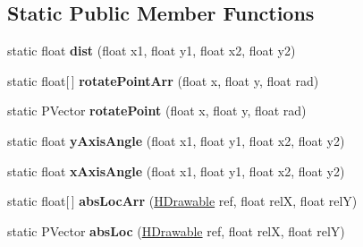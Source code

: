 \subsection*{Static Public Member Functions}
\begin{DoxyCompactItemize}
\item 
\hypertarget{classhype_1_1util_1_1_h_math_ad217e1364265a2807ccfea46656c98c3}{static float {\bfseries dist} (float x1, float y1, float x2, float y2)}\label{classhype_1_1util_1_1_h_math_ad217e1364265a2807ccfea46656c98c3}

\item 
\hypertarget{classhype_1_1util_1_1_h_math_ae8023e98d4523ae08d796cf9f62191f2}{static float\mbox{[}$\,$\mbox{]} {\bfseries rotate\-Point\-Arr} (float x, float y, float rad)}\label{classhype_1_1util_1_1_h_math_ae8023e98d4523ae08d796cf9f62191f2}

\item 
\hypertarget{classhype_1_1util_1_1_h_math_aa4e1bf088df604f61f7bf8a621cb8e99}{static P\-Vector {\bfseries rotate\-Point} (float x, float y, float rad)}\label{classhype_1_1util_1_1_h_math_aa4e1bf088df604f61f7bf8a621cb8e99}

\item 
\hypertarget{classhype_1_1util_1_1_h_math_a363476101dfefce8fb96f4de6a19ec16}{static float {\bfseries y\-Axis\-Angle} (float x1, float y1, float x2, float y2)}\label{classhype_1_1util_1_1_h_math_a363476101dfefce8fb96f4de6a19ec16}

\item 
\hypertarget{classhype_1_1util_1_1_h_math_a89e891d8dfbd6e884a753405a8b13d26}{static float {\bfseries x\-Axis\-Angle} (float x1, float y1, float x2, float y2)}\label{classhype_1_1util_1_1_h_math_a89e891d8dfbd6e884a753405a8b13d26}

\item 
\hypertarget{classhype_1_1util_1_1_h_math_a7d6bd8eafa0274325c68b60472b0999c}{static float\mbox{[}$\,$\mbox{]} {\bfseries abs\-Loc\-Arr} (\hyperlink{classhype_1_1drawable_1_1_h_drawable}{H\-Drawable} ref, float rel\-X, float rel\-Y)}\label{classhype_1_1util_1_1_h_math_a7d6bd8eafa0274325c68b60472b0999c}

\item 
\hypertarget{classhype_1_1util_1_1_h_math_a572a4aa9b5038abed726c0e6676f3405}{static P\-Vector {\bfseries abs\-Loc} (\hyperlink{classhype_1_1drawable_1_1_h_drawable}{H\-Drawable} ref, float rel\-X, float rel\-Y)}\label{classhype_1_1util_1_1_h_math_a572a4aa9b5038abed726c0e6676f3405}


\end{DoxyCompactItemize}

